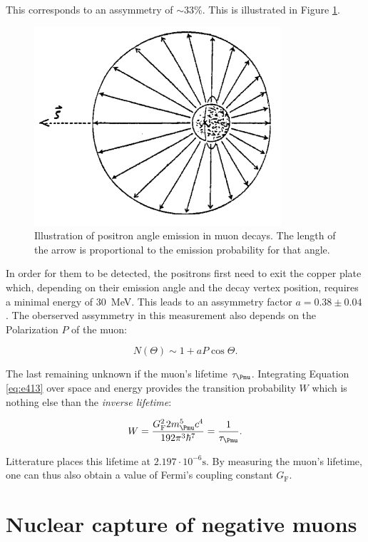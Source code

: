 This corresponds to an assymmetry of $\sim 33\%$. This is illustrated in Figure \ref{fig:emassy}.

\begin{figure}[htbp]
\centering
\includegraphics[width=0.7\linewidth]{./fig/emassy.png}
\caption{Illustration of positron angle emission in muon decays. The length of the arrow is proportional to the emission probability for that angle.}
\label{fig:emassy}
\end{figure}

In order for them to be detected, the positrons first need to exit the copper plate which, depending on their emission angle and the decay vertex position, requires a minimal energy of \SI{30}{\MeV}. This leads to an assymmetry factor $a=0.38\pm0.04$ \cite{Heel}. The oberserved assymmetry in this measurement also depends on the Polarization $P$ of the muon:

\begin{equation}
\label{eq:larg}
N(\Theta)\sim1+aP\cos{\Theta}.
\end{equation}

The last remaining unknown if the muon's lifetime $\tau_{\Pmu}$. Integrating Equation \ref{eq:e413} over space and energy provides the transition probability $W$ which is nothing else than the \textit{inverse lifetime}:

\begin{equation}
W=\frac{G^2_{\text{F}}2m_{\Pmu}^5c^4}{192\pi^3\hbar^7}=\frac{1}{\tau_{\Pmu}}.
\end{equation}

Litterature places this lifetime at $2.197\cdot 10^{-6} \si{\second}$. By measuring the muon's lifetime, one can thus also obtain a value of Fermi's coupling constant $G_{\text{F}}$.

\section{Nuclear capture of negative muons}

